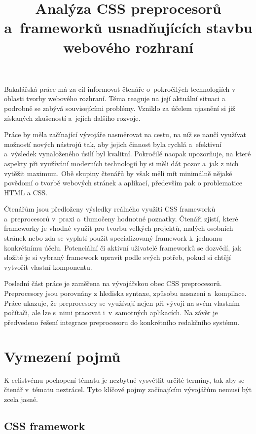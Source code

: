 \documentclass[thesis=B,czech]{FITthesis}[2012/06/26]
\title{Analýza CSS preprocesorů a~frameworků usnadňujících stavbu webového rozhraní}
\begin{document}

\begin{introduction}
	Bakalářská práce má za cíl informovat čtenáře o~pokročilých technologiích v oblasti tvorby webového rozhraní. Téma reaguje na její aktuální situaci a podrobně se zabývá souvisejícími problémy. Vzniklo za účelem ujasnění si již získaných zkušeností a~jejich dalšího rozvoje. 

Práce by měla začínající vývojáře nasměrovat na cestu, na níž se naučí využívat možností  nových nástrojů tak, aby jejich činnost byla rychlá a~efektivní a~výsledek vynaloženého úsilí byl kvalitní. Pokročilé naopak upozorňuje, na které aspekty při využívání moderních technologií by si měli dát pozor a~jak z nich vytěžit maximum. Obě skupiny čtenářů by však měli mít minimálně nějaké povědomí o tvorbě webových stránek a aplikací, především pak o problematice HTML a CSS.

Čtenářům jsou předloženy výsledky reálného využití CSS frameworků a~preprocesorů v~praxi a~tlumočeny hodnotné poznatky. Čtenáři zjistí, které frameworky je vhodné využít pro tvorbu velkých projektů, malých osobních stránek nebo zda se vyplatí použít specializovaný framework k~jednomu konkrétnímu účelu. Potenciální či aktivní uživatelé frameworků se dozvědí, jak složité je si vybraný framework upravit podle svých potřeb, pokud si chtějí vytvořit vlastní komponentu. 

Poslední část práce je zaměřena na vývojářskou obec CSS preprocesorů. Preprocesory jsou porovnány z hlediska syntaxe, způsobu nasazení a~kompilace. Práce ukazuje, že preprocesory se využívají nejen při vývoji na svém vlastním počítači, ale lze s~nimi pracovat i~v~samotných aplikacích. Na závěr je předvedeno řešení integrace preprocesoru do konkrétního redakčního systému. 

\end{introduction}

\chapter{Vymezení pojmů}
K celistvému pochopení tématu je nezbytné vysvětlit určité termíny, tak aby se čtenář v~tématu neztrácel. Tyto klíčové pojmy začínajícím vývojářům nemusí být zcela jasné. 


\section{CSS framework}
\end{document}
